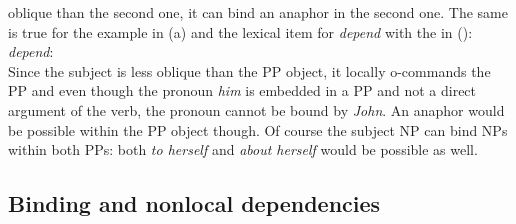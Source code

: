 \documentclass[output=paper
 	        ,biblatex
                ,babelshorthands
                ,newtxmath
                ,draftmode
                ,colorlinks, citecolor=brown
]{langscibook}
\begin{document}
oblique than the second one, it can bind an anaphor in the second one. The same is true for the
example in (a) and the lexical item for \emph{depend} with the \argst in ():
\ea
\emph{depend}:\\
\argst {}
\z
Since the subject is less oblique than the PP object, it locally o-commands
the PP and even though the pronoun \emph{him} is embedded in a PP and not a direct argument of the verb,
the pronoun cannot be bound by \emph{John}. An anaphor would be possible within the PP object though.
Of course the subject NP can bind NPs within both PPs: both \emph{to herself} and \emph{about
  herself} would be possible as well.\label{binding:page-prepositional-objects-end}


\subsection{Binding and nonlocal dependencies}

\end{document}
